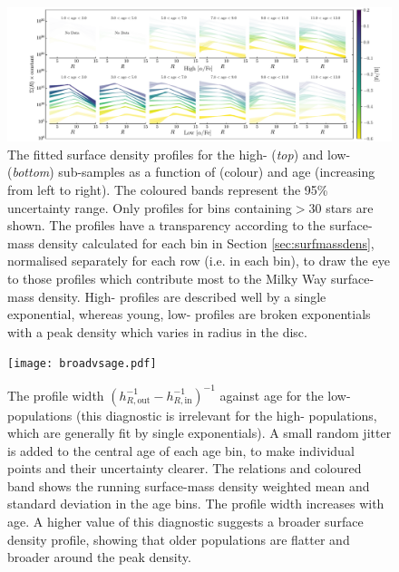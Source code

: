 \begin{landscape}
\begin{figure}
\includegraphics[width=1.0\textwidth]{surfdens_profile_adjusted.pdf}
      \centering
     \caption[Surface density profiles of mono-age, mono-\feh{} populations in the low and high-\afe{} disc components of the Milky Way]{The fitted surface density profiles for the high-\afe{} (\emph{top}) and low-\afe{} (\emph{bottom}) sub-samples as a function of \feh{} (colour) and age (increasing from left to right). The coloured bands represent the 95\% uncertainty range.  Only profiles for bins containing$ > 30$ stars are shown. The profiles have a transparency according to the surface-mass density calculated for each bin in Section \ref{sec:surfmassdens}, normalised separately for each row (i.e. in each \feh{} bin), to draw the eye to those profiles which contribute most to the Milky Way surface-mass density. High-\afe{} profiles are described well by a single exponential, whereas young, low-\afe{} profiles are broken exponentials with a peak density which varies in radius in the disc.}
     \label{fig:surfdens}
 \end{figure}
\end{landscape}


 \begin{figure}
 	\texttt{[image: broadvsage.pdf]}
     \caption[The broadening of surface density profiles as a function of age in the low-\afe{} mono-age, mono-\feh{} populations]{The profile width $(h_{R,\mathrm{out}}^{-1} - h_{R,\mathrm{in}}^{-1})^{-1}$ against age for the low-\afe{} populations (this diagnostic is irrelevant for the high-\afe{} populations, which are generally fit by single exponentials). A small random jitter is added to the central age of each age bin, to make individual points and their uncertainty clearer. The relations and coloured band shows the running surface-mass density weighted mean and standard deviation in the age bins. The profile width increases with age. A higher value of this diagnostic suggests a broader surface density profile, showing that older populations are flatter and broader around the peak density.}
     \label{fig:agevsbroadening}
 \end{figure}




